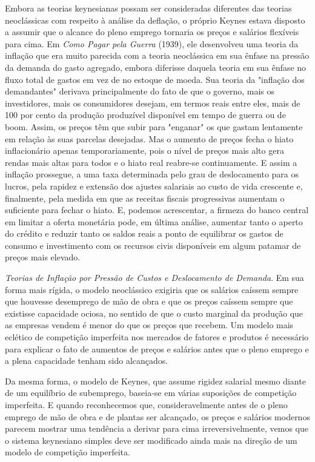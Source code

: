 \documentclass[12pt]{article}
\begin{document}
Embora as teorias keynesianas possam ser consideradas diferentes das teorias neoclássicas com respeito à análise da deflação, o próprio Keynes estava disposto a assumir que o alcance do pleno emprego tornaria os preços e salários flexíveis para cima. Em \textit{Como Pagar pela Guerra} (1939), ele desenvolveu uma teoria da inflação que era muito parecida com a teoria neoclássica em sua ênfase na pressão da demanda do gasto agregado, embora diferisse daquela teoria em sua ênfase no fluxo total de gastos em vez de no estoque de moeda. Sua teoria da "inflação dos demandantes" derivava principalmente do fato de que o governo, mais os investidores, mais os consumidores desejam, em termos reais entre eles, mais de 100 por cento da produção produzível disponível em tempo de guerra ou de boom. Assim, os preços têm que subir para "enganar" os que gastam lentamente em relação às suas parcelas desejadas. Mas o aumento de preços fecha o hiato inflacionário apenas temporariamente, pois o nível de preços mais alto gera rendas mais altas para todos e o hiato real reabre-se continuamente. E assim a inflação prossegue, a uma taxa determinada pelo grau de deslocamento para os lucros, pela rapidez e extensão dos ajustes salariais ao custo de vida crescente e, finalmente, pela medida em que as receitas fiscais progressivas aumentam o suficiente para fechar o hiato. E, podemos acrescentar, a firmeza do banco central em limitar a oferta monetária pode, em última análise, aumentar tanto o aperto do crédito e reduzir tanto os saldos reais a ponto de equilibrar os gastos de consumo e investimento com os recursos civis disponíveis em algum patamar de preços mais elevado.

\textit{Teorias de Inflação por Pressão de Custos e Deslocamento de Demanda}. Em sua forma mais rígida, o modelo neoclássico exigiria que os salários caíssem sempre que houvesse desemprego de mão de obra e que os preços caíssem sempre que existisse capacidade ociosa, no sentido de que o custo marginal da produção que as empresas vendem é menor do que os preços que recebem. Um modelo mais eclético de competição imperfeita nos mercados de fatores e produtos é necessário para explicar o fato de aumentos de preços e salários antes que o pleno emprego e a plena capacidade tenham sido alcançados.

Da mesma forma, o modelo de Keynes, que assume rigidez salarial mesmo diante de um equilíbrio de subemprego, baseia-se em várias suposições de competição imperfeita. E quando reconhecemos que, consideravelmente antes de o pleno emprego de mão de obra e de plantas ser alcançado, os preços e salários modernos parecem mostrar uma tendência a derivar para cima irreversivelmente, vemos que o sistema keynesiano simples deve ser modificado ainda mais na direção de um modelo de competição imperfeita.
\end{document}

